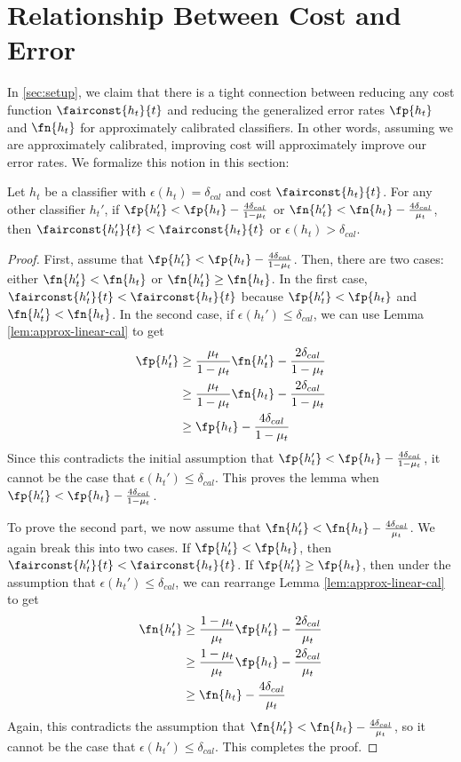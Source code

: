 \section{Relationship Between Cost and Error}
\label{sec:cost_and_error}

In \autoref{sec:setup}, we claim that there is a tight connection
between reducing any cost function $\fairconst{h_t}{t}$ and reducing the generalized
error rates $\fp{h_t}$ and $\fn{h_t}$
for approximately calibrated classifiers.
In other words, assuming we are approximately calibrated, improving cost will
approximately improve our error rates.
We formalize this notion in this section:
%
\begin{lemma}
  \label{lma:cost_error}
  Let $h_t$ be a classifier with $\epsilon(h_t) = \delta_{cal}$ and cost
  $\fairconst{h_t}{t}$. For any other classifier $h_t'$, if $\fp{h_t'} <
  \fp{h_t} - \frac{4\delta_{cal}}{1-\mu_t}$ or $\fn{h_t'} < \fn{h_t} -
  \frac{4\delta_{cal}}{\mu_t}$, then $\fairconst{h_t'}{t} <
  \fairconst{h_t}{t}$ or $\epsilon(h_t) > \delta_{cal}$.
  \label{lem:fpfn}
\end{lemma}
\begin{proof}
  First, assume that $\fp{h_t'} < \fp{h_t} - \frac{4\delta_{cal}}{1-\mu_t}$.
  Then, there are two cases: either $\fn{h_t'} < \fn{h_t}$ or $\fn{h_t'} \ge
  \fn{h_t}$. In the first case, $\fairconst{h_t'}{t} < \fairconst{h_t}{t}$
  because $\fp{h_t'} < \fp{h_t}$ and $\fn{h_t'} < \fn{h_t}$. In the second case,
  if $\epsilon(h_t') \le \delta_{cal}$, we can use Lemma
  \ref{lem:approx-linear-cal} to get
  \begin{align*}
    \fp{h_t'}
    &\ge \frac{\mu_t}{1-\mu_t} \fn{h_t'} -
    \frac{2\delta_{cal}}{1-\mu_t} \\
    &\ge \frac{\mu_t}{1-\mu_t} \fn{h_t} -
    \frac{2\delta_{cal}}{1-\mu_t} \\
    &\ge \fp{h_t} -
    \frac{4\delta_{cal}}{1-\mu_t}
  \end{align*}
  Since this contradicts the initial assumption that $\fp{h_t'} < \fp{h_t} -
  \frac{4\delta_{cal}}{1-\mu_t}$, it cannot be the case that $\epsilon(h_t') \le
  \delta_{cal}$. This proves the lemma when $\fp{h_t'} < \fp{h_t} -
  \frac{4\delta_{cal}}{1-\mu_t}$.

  To prove the second part, we now assume that $\fn{h_t'} < \fn{h_t} -
  \frac{4\delta_{cal}}{\mu_t}$. We again break this into two cases. If
  $\fp{h_t'} < \fp{h_t}$, then $\fairconst{h_t'}{t} < \fairconst{h_t}{t}$. If
  $\fp{h_t'} \ge \fp{h_t}$, then under the assumption that $\epsilon(h_t') \le
  \delta_{cal}$, we can rearrange Lemma \ref{lem:approx-linear-cal} to get
  \begin{align*}
    \fn{h_t'}
    &\ge \frac{1-\mu_t}{\mu_t} \fp{h_t'} -
    \frac{2\delta_{cal}}{\mu_t} \\
    &\ge \frac{1-\mu_t}{\mu_t} \fp{h_t} -
    \frac{2\delta_{cal}}{\mu_t} \\
    &\ge \fn{h_t} -
    \frac{4\delta_{cal}}{\mu_t}
  \end{align*}
  Again, this contradicts the assumption that $\fn{h_t'} < \fn{h_t} -
  \frac{4\delta_{cal}}{\mu_t}$, so it cannot be the case that
  $\epsilon(h_t') \le \delta_{cal}$. This completes the proof.
\end{proof}

